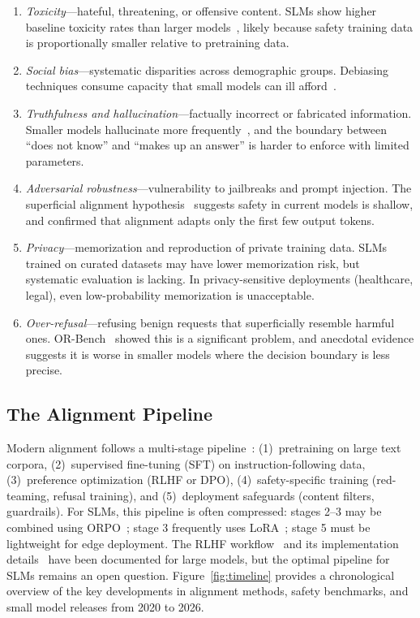 \documentclass[12pt,a4paper]{article}
\begin{document}
\begin{enumerate}[leftmargin=*]
    \item \emph{Toxicity}---hateful, threatening, or offensive content. SLMs show higher baseline toxicity rates than larger models~\citep{gehman2020realtoxicity}, likely because safety training data is proportionally smaller relative to pretraining data.
    \item \emph{Social bias}---systematic disparities across demographic groups. Debiasing techniques consume capacity that small models can ill afford~\citep{gallegos2024bias}.
    \item \emph{Truthfulness and hallucination}---factually incorrect or fabricated information. Smaller models hallucinate more frequently~\citep{lin2022truthfulqa}, and the boundary between ``does not know'' and ``makes up an answer'' is harder to enforce with limited parameters.
    \item \emph{Adversarial robustness}---vulnerability to jailbreaks and prompt injection. The superficial alignment hypothesis~\citep{yi2024superficial} suggests safety in current models is shallow, and \citet{qi2025shallow} confirmed that alignment adapts only the first few output tokens.
    \item \emph{Privacy}---memorization and reproduction of private training data. SLMs trained on curated datasets may have lower memorization risk, but systematic evaluation is lacking. In privacy-sensitive deployments (healthcare, legal), even low-probability memorization is unacceptable.
    \item \emph{Over-refusal}---refusing benign requests that superficially resemble harmful ones. OR-Bench~\citep{cui2024orbench} showed this is a significant problem, and anecdotal evidence suggests it is worse in smaller models where the decision boundary is less precise.
\end{enumerate}

\subsection{The Alignment Pipeline}

Modern alignment follows a multi-stage pipeline~\citep{ouyang2022training}: (1)~pretraining on large text corpora, (2)~supervised fine-tuning (SFT) on instruction-following data, (3)~preference optimization (RLHF or DPO), (4)~safety-specific training (red-teaming, refusal training), and (5)~deployment safeguards (content filters, guardrails). For SLMs, this pipeline is often compressed: stages 2--3 may be combined using ORPO~\citep{hong2024orpo}; stage 3 frequently uses LoRA~\citep{thakkar2024tradeoffs}; stage 5 must be lightweight for edge deployment. The RLHF workflow~\citep{dong2024rlhf} and its implementation details~\citep{zheng2023secrets} have been documented for large models, but the optimal pipeline for SLMs remains an open question. Figure~\ref{fig:timeline} provides a chronological overview of the key developments in alignment methods, safety benchmarks, and small model releases from 2020 to 2026.
\end{document}
